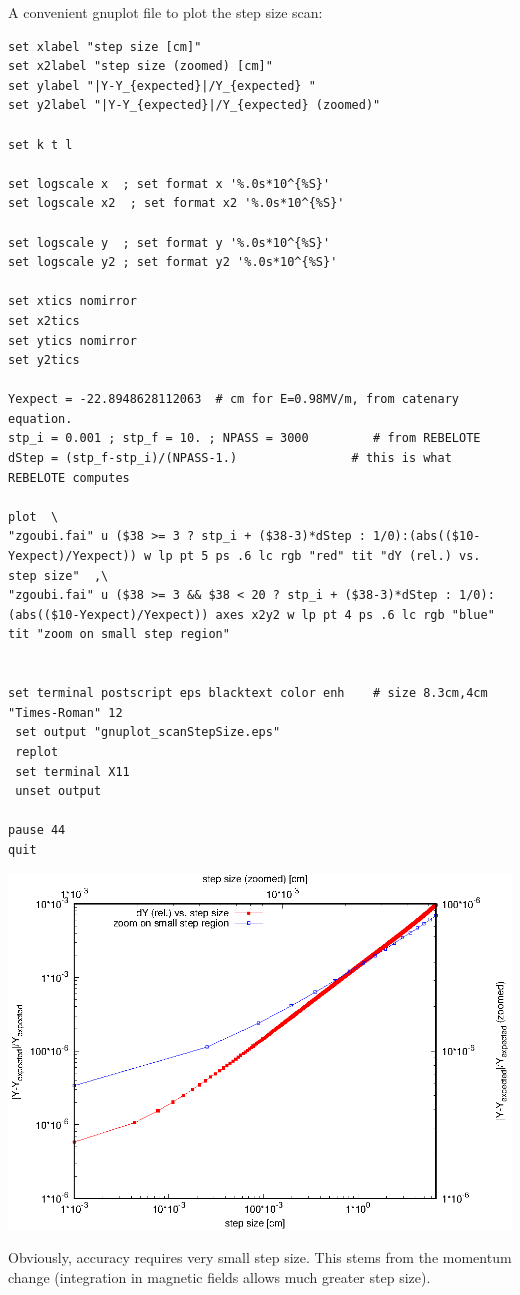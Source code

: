 \documentclass[10pt]{article}
\begin{document}
A convenient gnuplot file to plot the step size scan:
{\tiny
\begin{verbatim}
set xlabel "step size [cm]"
set x2label "step size (zoomed) [cm]"
set ylabel "|Y-Y_{expected}|/Y_{expected} "
set y2label "|Y-Y_{expected}|/Y_{expected} (zoomed)"

set k t l

set logscale x  ; set format x '%.0s*10^{%S}'  
set logscale x2  ; set format x2 '%.0s*10^{%S}'

set logscale y  ; set format y '%.0s*10^{%S}'
set logscale y2 ; set format y2 '%.0s*10^{%S}'

set xtics nomirror
set x2tics
set ytics nomirror
set y2tics

Yexpect = -22.8948628112063  # cm for E=0.98MV/m, from catenary equation.
stp_i = 0.001 ; stp_f = 10. ; NPASS = 3000         # from REBELOTE
dStep = (stp_f-stp_i)/(NPASS-1.)                # this is what REBELOTE computes

plot  \
"zgoubi.fai" u ($38 >= 3 ? stp_i + ($38-3)*dStep : 1/0):(abs(($10-Yexpect)/Yexpect)) w lp pt 5 ps .6 lc rgb "red" tit "dY (rel.) vs. step size"  ,\
"zgoubi.fai" u ($38 >= 3 && $38 < 20 ? stp_i + ($38-3)*dStep : 1/0):(abs(($10-Yexpect)/Yexpect)) axes x2y2 w lp pt 4 ps .6 lc rgb "blue" tit "zoom on small step region"  


set terminal postscript eps blacktext color enh    # size 8.3cm,4cm "Times-Roman" 12 
 set output "gnuplot_scanStepSize.eps" 
 replot 
 set terminal X11 
 unset output 

pause 44
quit
\end{verbatim}
}

\begin{minipage}{0.8\linewidth}
\centering
\includegraphics[width=0.5\linewidth]{gnuplot_scanStepSize.eps}

  Obviously, accuracy requires very small step size. This stems from the momentum change
  (integration in magnetic fields allows much greater step size).
\end{minipage}

   
\end{document}
